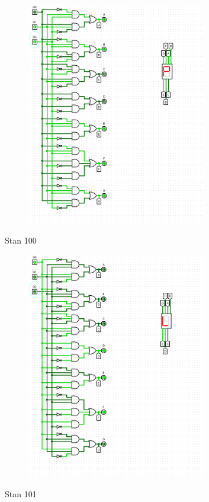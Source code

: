 \documentclass[]{article}
\begin{document}
\begin{figure}[H]
	\centering
	\includegraphics[width=0.7\textwidth]{DWA_011.png}
\end{figure}
\newpage
Stan 100
\begin{figure}[H]
	\centering
	\includegraphics[width=0.7\textwidth]{DWA_100.png}
\end{figure}
\newpage
Stan 101
\end{document}

